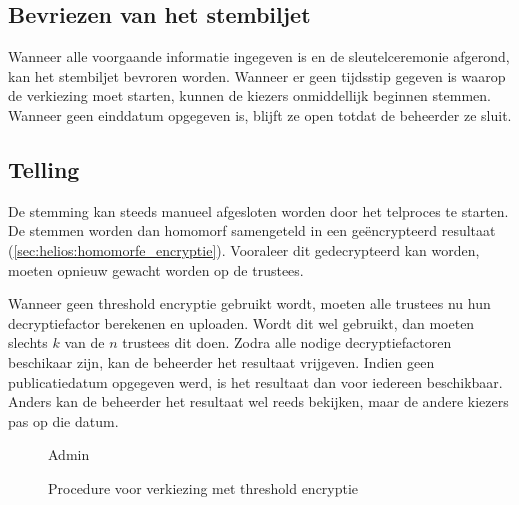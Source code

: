 \subsection{Bevriezen van het stembiljet}

Wanneer alle voorgaande informatie ingegeven is en de sleutelceremonie afgerond, kan het stembiljet bevroren worden. Wanneer er geen tijdsstip gegeven is waarop de verkiezing moet starten, kunnen de kiezers onmiddellijk beginnen stemmen. Wanneer geen einddatum opgegeven is, blijft ze open totdat de beheerder ze sluit.

\subsection{Telling}

De stemming kan steeds manueel afgesloten worden door het telproces te starten. De stemmen worden dan homomorf samengeteld in een geëncrypteerd resultaat (\ref{sec:helios:homomorfe_encryptie}). Vooraleer dit gedecrypteerd kan worden, moeten opnieuw gewacht worden op de trustees.

\npar Wanneer geen threshold encryptie gebruikt wordt, moeten alle trustees nu hun decryptiefactor berekenen en uploaden. Wordt dit wel gebruikt, dan moeten slechts $k$ van de $n$ trustees dit doen. Zodra alle nodige decryptiefactoren beschikaar zijn, kan de beheerder het resultaat vrijgeven. Indien geen publicatiedatum opgegeven werd, is het resultaat dan voor iedereen beschikbaar. Anders kan de beheerder het resultaat wel reeds bekijken, maar de andere kiezers pas op die datum.

\begin{figure}
  \caption{Admin}
  \label{fig:proc:elections_admin}
\end{figure}

\begin{figure}
  \centering
  \scalebox{.7}{}
  \caption{Procedure voor verkiezing met threshold encryptie}
  \label{fig:proc:procedure_threshold}
\end{figure}
